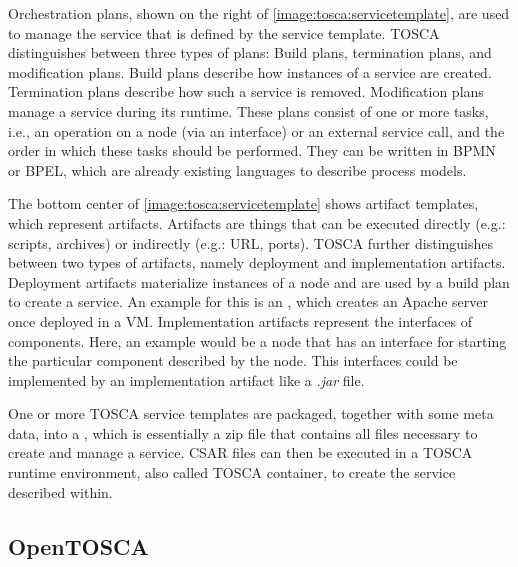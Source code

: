 Orchestration plans, shown on the right of \autoref{image:tosca:servicetemplate}, are used to manage the service that is defined by the service template. TOSCA distinguishes between three types of plans: Build plans, termination plans, and modification plans.
Build plans describe how instances of a service are created.
Termination plans describe how such a service is removed.
Modification plans manage a service during its runtime.
These plans consist of one or more tasks, i.e., an operation on a node (via an interface) or an external service call, and the order in which these tasks should be performed.
They can be written in BPMN or BPEL, which are already existing languages to describe process models.

The bottom center of \autoref{image:tosca:servicetemplate} shows artifact templates, which represent artifacts.
Artifacts are things that can be executed directly (e.g.: scripts, archives) or indirectly (e.g.: URL, ports).
TOSCA further distinguishes between two types of artifacts, namely deployment and implementation artifacts.
Deployment artifacts materialize instances of a node and are used by a build plan to create a service.
An example for this is an , which creates an Apache server once deployed in a VM.
Implementation artifacts represent the interfaces of components.
Here, an example would be a node that has an interface for starting the particular component described by the node.
This interfaces could be implemented by an implementation artifact like a \textit{.jar} file.

One or more TOSCA service templates are packaged, together with some meta data, into a , which is essentially a zip file that contains all files necessary to create and manage a service.
CSAR files can then be executed in a TOSCA runtime environment, also called TOSCA container, to create the service described within.

\subsection{OpenTOSCA}

